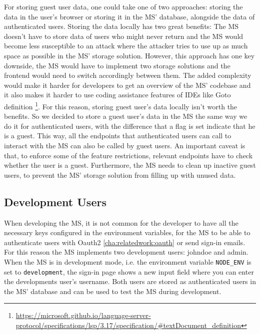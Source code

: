 For storing guest user data, one could take one of two approaches:
storing the data in the user's browser or storing it in the MS' database, alongside the
data of authenticated users.
Storing the data locally has two great benefits:
The MS doesn't have to store data of users who might never return and
the MS would become less susceptible to an attack where the attacker tries to use up as
much space as possible in the MS' storage solution.
However, this approach has one key downside, the MS would have to implement two storage
solutions and the frontend would need to switch accordingly between them.
The added complexity would make it harder for developers to get an overview of the MS'
codebase and it also makes it harder to use coding assistance features of IDEs like Goto
definition \footnote{\url{https://microsoft.github.io/language-server-protocol/specifications/lsp/3.17/specification/\#textDocument_definition}}.
For this reason, storing guest user's data locally isn't worth the benefits.
So we decided to store a guest user's data in the MS the same way we do it for
authenticated users,
with the difference that a flag is set
indicate that he is a guest.
This way, all the endpoints that authenticated users can call to interact with the MS
can also be called by guest users.
An important caveat is that, to enforce some of the feature restrictions, relevant
endpoints have to check whether the user is a guest.
Furthermore, the MS needs to clean up inactive guest users, to prevent the MS' storage
solution from filling up with unused data.

\subsection{Development Users}

When developing the MS, it is not common for the developer to have all the necessary keys
configured in the environment variables, for the MS to be able to authenticate users with
Oauth2 \ref{cha:relatedwork:oauth} or send sign-in emails.
For this reason the MS implements two development users: johndoe and admin.
When the MS is in development mode, i.e. the environment variable \lstinline{NODE_ENV} is
set to \lstinline{development},
the sign-in page shows a new input field where you can enter the developments user's username.
Both users are stored as authenticated users in the MS' database and can be used to test
the MS during development.



